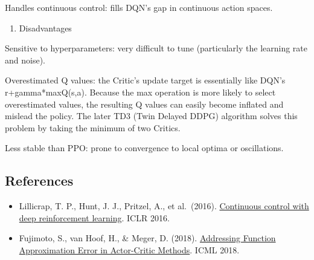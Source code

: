 Handles continuous control: fills DQN's gap in continuous action spaces.

\begin{enumerate}
\def\labelenumi{\arabic{enumi}.}
\setcounter{enumi}{1}
\tightlist
\item
  Disadvantages
\end{enumerate}

Sensitive to hyperparameters: very difficult to tune (particularly the learning rate and noise).

Overestimated Q values: the Critic's update target is essentially like DQN's r+gamma*maxQ(s,a). Because the max operation is more likely to select overestimated values, the resulting Q values can easily become inflated and mislead the policy. The later TD3 (Twin Delayed DDPG) algorithm solves this problem by taking the minimum of two Critics.

Less stable than PPO: prone to convergence to local optima or oscillations.

\FloatBarrier
{}
\hypertarget{references-60}{%
\subsection{References}\label{references-60}}

\vspace{0.25em}
\begin{itemize}
\tightlist
\item
  Lillicrap, T. P., Hunt, J. J., Pritzel, A., et al.~(2016). \href{https://arxiv.org/abs/1509.02971}{Continuous control with deep reinforcement learning}. ICLR 2016.
\item
  Fujimoto, S., van Hoof, H., \& Meger, D. (2018). \href{https://proceedings.mlr.press/v80/fujimoto18a.html}{Addressing Function Approximation Error in Actor-Critic Methods}. ICML 2018.
\end{itemize}

\clearpage

